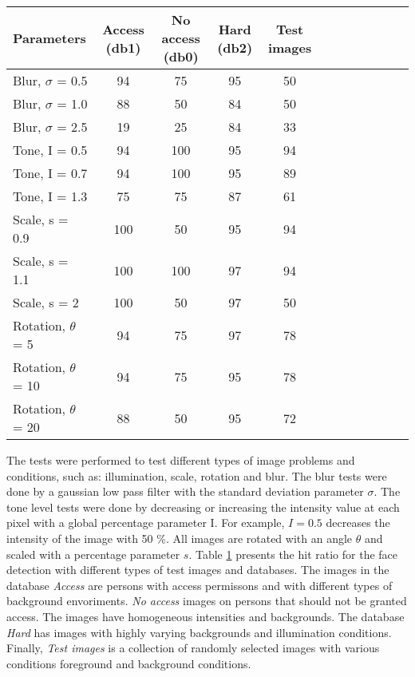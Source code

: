 \begin{table}
  \label{tb:result}
\begin{tabular}{l*{10}{c}r}
\hline
Parameters & Access (db1) & No access (db0) & Hard (db2) & Test images \\
\hline
Blur, $\sigma$ = 0.5  & 94 	& 75 		& 95 		& 50  \\ \hline
Blur, $\sigma$ = 1.0  & 88 		& 50 		& 84 	& 50 \\ \hline
Blur, $\sigma$ = 2.5  & 19 	& 25 		& 84 		& 33 \\ \hline
Tone, I = 0.5  		& 94 	& 100	 		& 95		& 94 \\ \hline
Tone, I = 0.7  		& 94		& 100   	    & 95 	& 89 	\\ \hline
Tone, I = 1.3  		& 75		& 75		& 87 	& 61 	 \\ \hline
Scale, s = 0.9 		& 100 		& 50 		& 95 	& 94 	 \\ \hline
Scale, s = 1.1  		& 100 		& 100 		& 97 	& 94		  \\ \hline
Scale, s = 2  			& 100 		& 50		& 97 	& 50		  \\ \hline
Rotation, $\theta$ = 5  	& 94 	& 75		& 97 		& 78 	 \\ \hline
Rotation, $\theta$ = 10   & 94 	& 75		& 95 		& 78 	 \\ \hline
Rotation, $\theta$ = 20   & 88 		& 50		& 95 	& 72 	 \\ \hline
\end{tabular}
\end{table}

The tests were performed to test different types of image problems and conditions, such as: illumination, scale, rotation and blur. The blur tests were done by a gaussian low pass filter with the standard deviation parameter $\sigma$.
The tone level tests were done by decreasing or increasing the intensity value at each pixel with a global percentage parameter I. For example, $ I = 0.5$ decreases the intensity of the image with 50 \%.
All images are rotated with an angle $\theta$ and scaled with a percentage parameter $s$.
\newline
\indent Table \ref{tb:result} presents the hit ratio for the face detection with different types of test images and databases.
The images in the database \textit{Access} are persons with access permissons and with different types of background envoriments.
\textit{No access} images on persons that should not be granted access. The images have homogeneous intensities and backgrounds.
The database \textit{Hard} has images with highly varying backgrounds and illumination conditions. Finally, \textit{Test images} is a collection of randomly selected images with various conditions foreground and background conditions. 

